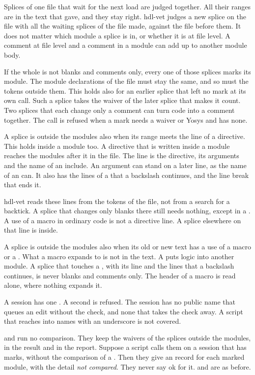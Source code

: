 Splices of one file that wait for the next load are judged together. All their ranges are
in the text that  gave, and they stay right. hdl-vet judges a new splice on
the file with all the waiting splices of the file made, against the file before them. It
does not matter which module a splice is in, or whether it is at file level. A comment at
file level and a comment in a module can add up to another module body.

If the whole is not blanks and comments only, every one of those splices marks its module.
The module declarations of the file must stay the same, and so must the tokens outside them.
This holds also for an earlier splice that left no mark at its own call. Such a splice takes
the waiver of the later splice that makes it count. Two splices that
each change only a comment can turn code into a comment together. The call is refused when a
mark needs a waiver or Yosys and has none.

A splice is outside the modules also when its range meets the line of a directive. This holds
inside a module too. A directive that is written inside a module reaches the modules after it
in the file. The line is the directive, its arguments and the name of an include. An argument can stand
on a later line, as the name of an  can. It also has
the lines of a  that a backslash continues, and the line break that ends it.

hdl-vet reads these lines from the tokens of the file, not from a search for a backtick. A
splice that changes only blanks there still needs nothing, except in a . A use
of a macro in ordinary code is not a directive line. A splice elsewhere on that line is inside.

A splice is outside the modules also when its old or new text has a use of a macro or a
. What a macro expands to is not in the text. A  puts logic into
another module. A splice that touches a , with its line and the lines that a
backslash continues, is never blanks and comments only. The header of a macro is read alone,
where nothing expands it.

A session has one . A second  is refused. The session has no
public name that queues an edit without the check, and none that takes the check away. A
script that reaches into names with an underscore is not covered.

 and  run no comparison. They keep the
waivers of the splices outside the modules, in the result and in the report. Suppose a script
calls them on a session that has marks, without the comparison of a . Then they
give an  record for each marked module, with the detail \emph{not compared}.
They never say ok for it.  and  are as before.

